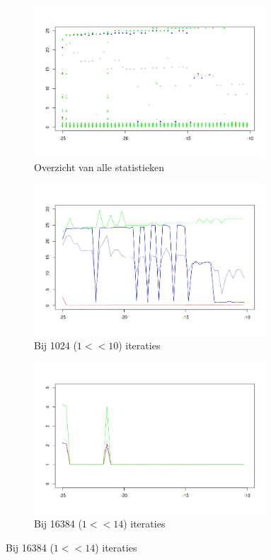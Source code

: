\documentclass{article}
\begin{document}
\begin{figure}[!htb]
 \caption{FPS/Precisie-plots ($\log_{10}(prec)$)}
 \begin{subfigure}{0.49\textwidth}
  \caption{Overzicht van alle statistieken}
  \includegraphics[width=0.95\textwidth]{elegant-gl/datasets/plot_prec}
 \end{subfigure}
 \begin{subfigure}{0.49\textwidth}
  \caption{Bij 1024 ($1 << 10$) iteraties}
  \includegraphics[width=0.95\textwidth]{elegant-gl/datasets/plot_prec_1024it}
 \end{subfigure}
 \begin{subfigure}{0.49\textwidth}
  \caption{Bij 16384 ($1 << 14$) iteraties}
  \includegraphics[width=0.95\textwidth]{elegant-gl/datasets/plot_prec_16384it}

\end{subfigure}
\end{figure}
\end{document}
